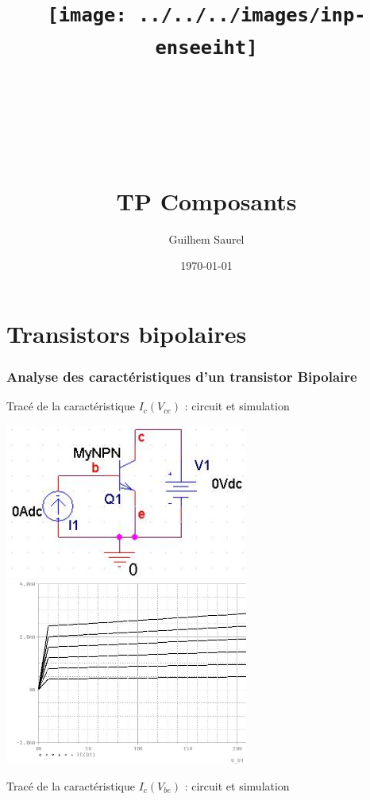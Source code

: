\documentclass[10pt]{article}
\title{\texttt{[image: ../../../images/inp-enseeiht]} \\ ~ \\ ~ \\ ~ \\ ~ \\
TP Composants}
\author{Guilhem Saurel}
\date{\today}
\begin{document}
 \begin{titlepage}
  \maketitle
  \tableofcontents
 \end{titlepage}

 \part{Transistors bipolaires}
  \section{Analyse des caractéristiques d’un transistor Bipolaire}
   \begin{center}
    Tracé de la caractéristique $I_c(V_{ce})$ : circuit et simulation
    
    \includegraphics[width=8cm]{I-I_carac-stat-npn_ic-vce_circuit.jpg}
    \includegraphics[width=8cm]{I-I_carac-stat-npn_ic-vce_simu.jpg}

    Tracé de la caractéristique $I_c(V_{be})$ : circuit et simulation


\end{center}
\end{document}
